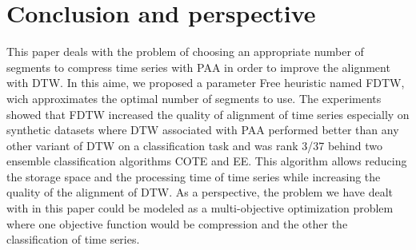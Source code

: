 \section{Conclusion and perspective}
\label{sec:5}
This paper deals with the problem of choosing an appropriate number of segments to compress time series with PAA in order to improve the alignment with DTW. In this aime, we proposed a parameter Free heuristic named FDTW, wich approximates the optimal number of segments to use. The experiments showed that FDTW increased the quality of alignment of time series especially on synthetic datasets where DTW associated with PAA performed better than any other variant of DTW on a classification task and was rank 3/37 behind two ensemble classification algorithms COTE and EE. This algorithm allows reducing the storage space and the processing time of time series while increasing the quality of the alignment of DTW. As a perspective, the problem we have dealt with in this paper could be modeled as a multi-objective optimization problem where one objective function would be compression and the other the classification of time series.
